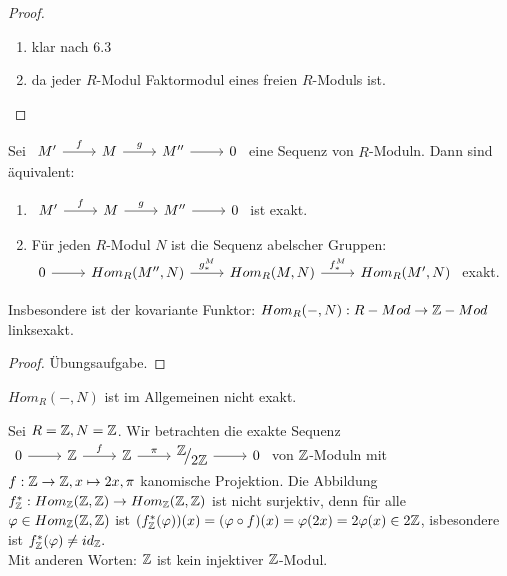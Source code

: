 \begin{proof}
	\begin{enumerate} [label= \alph*)]
		\item klar nach 6.3
		\item da jeder $R$-Modul Faktormodul eines freien $R$-Moduls ist. 
	\end{enumerate}
\end{proof}
\begin{sa}
	Sei $\begin{tikzcd}
	 M' \arrow{r}{f} & M \arrow{r}{g} & M'' \arrow{r} & 0
	\end{tikzcd} $ eine Sequenz von $R$-Moduln. Dann sind äquivalent:
	\begin{enumerate} [label= \roman*)]
		\item $\begin{tikzcd}
		M' \arrow{r}{f} & M \arrow{r}{g} & M'' \arrow{r} & 0
		\end{tikzcd} $ ist exakt.
		\item Für jeden $R$-Modul $N$ ist die Sequenz abelscher Gruppen: \\
		$\begin{tikzcd}
		0  \arrow{r} & Hom_{R}(M'',N) \arrow{r}{g_{*}^{M}} & Hom_{R}(M,N)  \arrow{r}{f_{*}^{M}} & Hom_{R}(M',N) \end{tikzcd}$ exakt.
	\end{enumerate}
	Insbesondere ist der kovariante Funktor: $Hom_R(-,N): R-Mod \to \mathbb{Z}-Mod $ linksexakt.
\end{sa}
\begin{proof}
	Übungsaufgabe.
\end{proof}
\begin{anm}
	$Hom_R(-,N) $ ist im Allgemeinen nicht exakt.
\end{anm}
\begin{bsp}
	Sei $ R= \mathbb{Z} , N = \mathbb{Z} $. Wir betrachten die exakte Sequenz \\
	 $\begin{tikzcd}
	0  \arrow{r} & \Z \arrow{r}{f} & \Z \arrow{r}{\pi} & \QR{\Z}{2\Z} \arrow{r} & 0
	\end{tikzcd} $ von $\mathbb{Z}$-Moduln mit $f: \mathbb{Z} \to \mathbb{Z} , x \mapsto 2x, \pi $ kanomische Projektion. Die Abbildung $ f_{\mathbb{Z}}^{*} : Hom_{\mathbb{Z}}(\mathbb{Z},\mathbb{Z}) \to Hom_{\mathbb{Z}}(\mathbb{Z},\mathbb{Z})$ ist nicht surjektiv, denn für alle $\varphi \in Hom_{\mathbb{Z}}(\mathbb{Z},\mathbb{Z})$ ist $ (f_{\mathbb{Z}}^{*}(\varphi))(x) = (\varphi \circ f)(x) = \varphi(2x) =2 \varphi(x) \in 2\mathbb{Z}$, isbesondere ist $ f_{\mathbb{Z}}^{*}(\varphi) \neq id_{\mathbb{Z}}. $ \\
	Mit anderen Worten: $\mathbb{Z}$ ist kein injektiver $\mathbb{Z}$-Modul.
\end{bsp}
